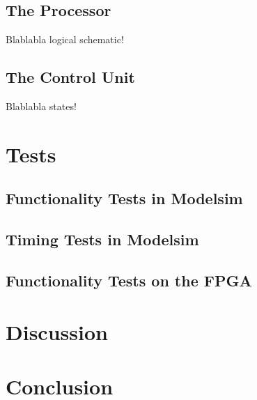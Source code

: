 \documentclass[11pt]{article}
\begin{document}
\subsection{The Processor}
\label{subsec:processor}
Blablabla logical schematic!

\subsection{The Control Unit}
\label{subsec:controlunit}
Blablabla states!


\section{Tests}
\label{sec:tests}

\subsection{Functionality Tests in Modelsim}
\label{subsec:functestsim}

\subsection{Timing Tests in Modelsim}
\label{subsec:timingtestsim}

\subsection{Functionality Tests on the FPGA}
\label{subsec:functestfpga}



\section{Discussion}
\label{sec:discussion}

\section{Conclusion}
\label{sec:conclusion}




\end{document}

